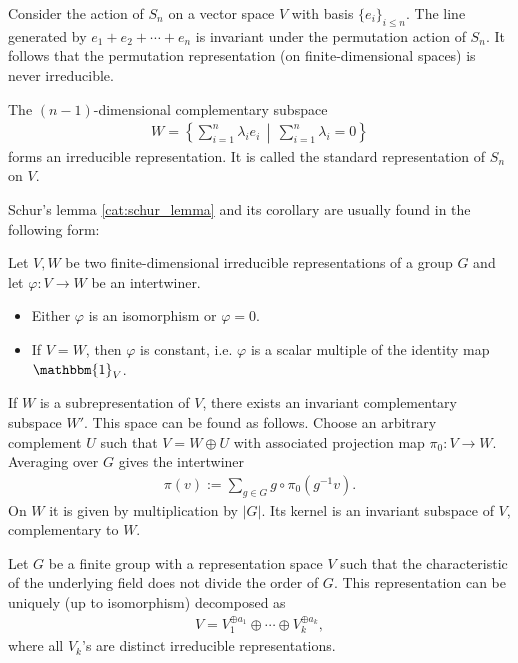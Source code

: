     \begin{example}
        Consider the action of $S_n$ on a vector space $V$ with basis $\{e_i\}_{i\leq n}$. The line generated by $e_1+e_2+\cdots+e_n$ is invariant under the permutation action of $S_n$. It follows that the permutation representation (on finite-dimensional spaces) is never irreducible.

        The $(n-1)$-dimensional complementary subspace
        \begin{gather}
            W = \left\{\sum_{i=1}^n\lambda_ie_i\,\middle\vert\,\sum_{i=1}^n\lambda_i=0\right\}
        \end{gather}
        forms an irreducible representation. It is called the standard representation of $S_n$ on $V$.
    \end{example}

    Schur's lemma \ref{cat:schur_lemma} and its corollary are usually found in the following form:
    \begin{theorem}\label{rep:schurs_lemma}
        Let $V,W$ be two finite-dimensional irreducible representations of a group $G$ and let $\varphi:V\rightarrow W$ be an intertwiner.
        \begin{itemize}
            \item Either $\varphi$ is an isomorphism or $\varphi=0$.
            \item If $V=W$, then $\varphi$ is constant, i.e. $\varphi$ is a scalar multiple of the identity map $\mathbbm{1}_V$.
        \end{itemize}
    \end{theorem}

    \begin{property}
        If $W$ is a subrepresentation of $V$, there exists an invariant complementary subspace $W'$. This space can be found as follows. Choose an arbitrary complement $U$ such that $V=W \oplus U$ with associated projection map $\pi_0:V \rightarrow W$. Averaging over $G$ gives the intertwiner
        \begin{gather}
            \pi(v) := \sum_{g\in G}g\circ\pi_0(g^{-1}v).
        \end{gather}
        On $W$ it is given by multiplication by $|G|$. Its kernel is an invariant subspace of $V$, complementary to $W$.
    \end{property}
    \begin{theorem}[Maschke]
        Let $G$ be a finite group with a representation space $V$ such that the characteristic of the underlying field does not divide the order of $G$. This representation can be uniquely (up to isomorphism) decomposed as
        \begin{gather}
            V = V_1^{\oplus a_1}\oplus\cdots\oplus V_k^{\oplus a_k},
        \end{gather}
        where all $V_k$'s are distinct irreducible representations.
    \end{theorem}

